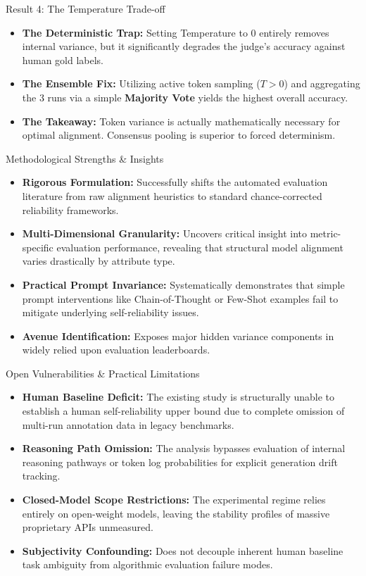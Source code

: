 \documentclass[10pt]{beamer}
\begin{document}
\begin{frame}{Result 4: The Temperature Trade-off}
  \begin{itemize}
    \item \textbf{The Deterministic Trap:} Setting Temperature to 0 entirely removes internal variance, but it significantly degrades the judge's accuracy against human gold labels.
    \item \textbf{The Ensemble Fix:} Utilizing active token sampling ($T>0$) and aggregating the 3 runs via a simple \textbf{Majority Vote} yields the highest overall accuracy.
    \item \textbf{The Takeaway:} Token variance is actually mathematically necessary for optimal alignment. Consensus pooling is superior to forced determinism.
  \end{itemize}
\end{frame}

\begin{frame}{Methodological Strengths \& Insights}
  \begin{itemize}
    \item \textbf{Rigorous Formulation:} Successfully shifts the automated evaluation literature from raw alignment heuristics to standard chance-corrected reliability frameworks.
    \item \textbf{Multi-Dimensional Granularity:} Uncovers critical insight into metric-specific evaluation performance, revealing that structural model alignment varies drastically by attribute type.
    \item \textbf{Practical Prompt Invariance:} Systematically demonstrates that simple prompt interventions like Chain-of-Thought or Few-Shot examples fail to mitigate underlying self-reliability issues.
    \item \textbf{Avenue Identification:} Exposes major hidden variance components in widely relied upon evaluation leaderboards.
  \end{itemize}
\end{frame}

\begin{frame}{Open Vulnerabilities \& Practical Limitations}
  \begin{itemize}
    \item \textbf{Human Baseline Deficit:} The existing study is structurally unable to establish a human self-reliability upper bound due to complete omission of multi-run annotation data in legacy benchmarks.
    \item \textbf{Reasoning Path Omission:} The analysis bypasses evaluation of internal reasoning pathways or token log probabilities for explicit generation drift tracking.
    \item \textbf{Closed-Model Scope Restrictions:} The experimental regime relies entirely on open-weight models, leaving the stability profiles of massive proprietary APIs unmeasured.
    \item \textbf{Subjectivity Confounding:} Does not decouple inherent human baseline task ambiguity from algorithmic evaluation failure modes.
  \end{itemize}
\end{frame}
\end{document}
